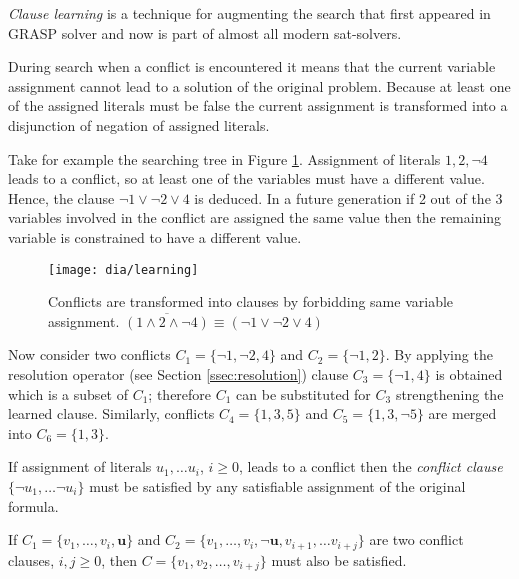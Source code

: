 \emph{Clause learning} is a technique for augmenting the search
that first appeared in GRASP solver \cite{Marques-silva99grasp:a}
and now is part of almost all modern sat-solvers.

During search when a conflict is encountered it means that the
current variable assignment cannot lead to a solution of the original
problem. Because at least one of the assigned literals must be false
the current assignment is transformed into a disjunction of negation
of assigned literals.

Take for example the searching tree in Figure \ref{fig:learning}.
Assignment of literals $1, 2, \neg 4$ leads to a conflict, so at
least one of the variables must have a different value. Hence,
the clause $\neg 1 \lor \neg 2 \lor 4$ is deduced. In a future
generation if 2 out of the 3 variables involved in the conflict are
assigned the same value then the remaining variable is constrained
to have a different value.

\begin{figure}
  \centering
  \texttt{[image: dia/learning]}
  \caption{Conflicts are transformed into clauses by forbidding
  same variable assignment.
  $\overline{(1 \land 2 \land \neg 4)} \equiv (\neg 1 \lor \neg 2 \lor 4)$}
  \label{fig:learning}
\end{figure}

Now consider two conflicts $C_1 = \{ \neg 1, \neg 2, 4 \}$ and
$C_2 = \{ \neg 1, 2 \}$.  By applying the resolution operator
(see Section \ref{ssec:resolution}) clause $C_3 = \{ \neg 1,
4 \}$ is obtained which is a subset of $C_1$; therefore $C_1$ can
be substituted for $C_3$ strengthening the learned clause. Similarly,
conflicts $C_4 = \{ 1, 3, 5 \}$ and $C_5 = \{1, 3, \neg 5\}$ are
merged into $C_6 = \{ 1, 3 \}$.

\begin{myprop}
  If assignment of literals $u_1, \ldots u_i$, $i \ge 0$, leads to
  a conflict then the \emph{conflict clause} $\{ \neg u_1, \ldots
  \neg u_i \}$ must be satisfied by any satisfiable assignment of
  the original formula.
\end{myprop}

\begin{myprop}
  If $C_1 = \{ v_1, \ldots, v_i, \mathbf{u} \}$ and $C_2 = \{
  v_1, \ldots, v_i, \mathbf{\neg u}, v_{i+1}, \ldots v_{i+j} \}$
  are two conflict clauses, $i, j \ge 0$, then $C = \{ v_1, v_2,
  \ldots, v_{i+j} \}$ must also be satisfied.
\end{myprop}

